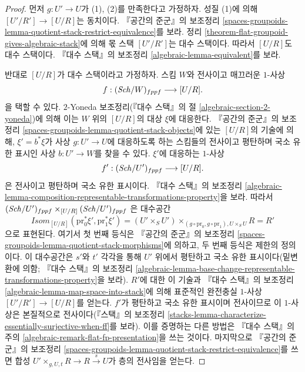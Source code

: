 \begin{proof}
먼저 $g : U' \to U$가 (1), (2)를 만족한다고 가정하자. 성질 (1)에 의해
$[U'/R'] \to [U/R]$는 동치이다. 『공간의 준군』의 보조정리
\ref{spaces-groupoids-lemma-quotient-stack-restrict-equivalence}를 보라.
정리 \ref{theorem-flat-groupoid-gives-algebraic-stack}에 의해 몫 스택
$[U'/R']$는 대수 스택이다. 따라서 $[U/R]$도 대수 스택이다.
『대수 스택』의 보조정리 \ref{algebraic-lemma-equivalent}를 보라.

\medskip\noindent
반대로 $[U/R]$가 대수 스택이라고 가정하자. 스킴 $W$와 전사이고
매끄러운 $1$-사상
$$
f : (\mathit{Sch}/W)_{fppf} \longrightarrow [U/R].
$$
을 택할 수 있다. $2$-Yoneda 보조정리(『대수 스택』의 절
\ref{algebraic-section-2-yoneda})에 의해 이는 $W$ 위의 $[U/R]$의 대상
$\xi$에 대응한다. 『공간의 준군』의 보조정리
\ref{spaces-groupoids-lemma-quotient-stack-objects}에 있는 $[U/R]$의
기술에 의해, $\xi' = b^*\xi$가 사상 $g : U' \to U$에 대응하도록 하는
스킴들의 전사이고 평탄하며 국소 유한 표시인 사상 $b : U' \to W$를
찾을 수 있다. $\xi'$에 대응하는 $1$-사상
$$
f' : (\mathit{Sch}/U')_{fppf} \longrightarrow [U/R].
$$
은 전사이고 평탄하며 국소 유한 표시이다. 『대수 스택』의 보조정리
\ref{algebraic-lemma-composition-representable-transformations-property}을
보라. 따라서
$(\mathit{Sch}/U')_{fppf} \times_{[U/R]} (\mathit{Sch}/U')_{fppf}$
은 대수공간
$$
\mathit{Isom}_{[U/R]}(\text{pr}_0^*\xi', \text{pr}_1^*\xi') =
(U' \times_S U')
\times_{(g \circ \text{pr}_0, g \circ \text{pr}_1), U \times_S U} R = R'
$$
으로 표현된다. 여기서 첫 번째 등식은 『공간의 준군』의 보조정리
\ref{spaces-groupoids-lemma-quotient-stack-morphisms}에 의하고, 두 번째
등식은 제한의 정의이다. 이 대수공간은 $s'$와 $t'$ 각각을 통해
$U'$ 위에서 평탄하고 국소 유한 표시이다(밑변환에 의함; 『대수 스택』의
보조정리
\ref{algebraic-lemma-base-change-representable-transformations-property}을 보라).
$R'$에 대한 이 기술과 『대수 스택』의 보조정리
\ref{algebraic-lemma-map-space-into-stack}에 의해 표준적인 완전충실
$1$-사상 $[U'/R'] \to [U/R]$를 얻는다. $f'$가 평탄하고 국소 유한
표시이며 전사이므로 이 $1$-사상은 본질적으로 전사이다(『스택』의 보조정리
\ref{stacks-lemma-characterize-essentially-surjective-when-ff}를 보라).
이를 증명하는 다른 방법은 『대수 스택』의 주의
\ref{algebraic-remark-flat-fp-presentation}을 쓰는 것이다. 마지막으로
『공간의 준군』의 보조정리
\ref{spaces-groupoids-lemma-quotient-stack-restrict-equivalence}를 쓰면 합성
$U' \times_{g, U, t} R \to R \xrightarrow{s} U$가 층의 전사임을 얻는다.
\end{proof}

